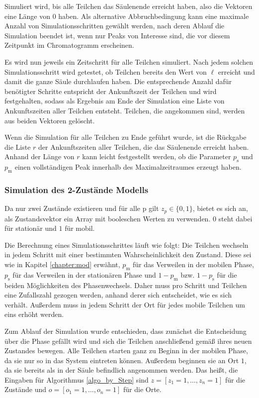 Simuliert wird, bis alle Teilchen das Säulenende erreicht haben, also die Vektoren eine Länge von $0$ haben. 
Als alternative Abbruchbedingung kann eine maximale Anzahl von Simulationsschritten gewählt werden, nach deren Ablauf die Simulation beendet ist, wenn nur Peaks von Interesse sind, die vor diesem Zeitpunkt im Chromatogramm erscheinen.

Es wird nun jeweils ein Zeitschritt für alle Teilchen simuliert. Nach jedem solchen Simulationsschritt wird getestet, ob Teilchen bereits den Wert von $\ell$ erreicht und damit die ganze Säule durchlaufen haben. Die entsprechende Anzahl dafür benötigter Schritte entspricht der Ankunftszeit der Teilchen und wird festgehalten, sodass als Ergebnis am Ende der Simulation eine Liste von Ankunftszeiten aller Teilchen entsteht. Teilchen, die angekommen sind, werden aus beiden Vektoren gelöscht.

Wenn die Simulation für alle Teilchen zu Ende geführt wurde, ist die Rückgabe die Liste $r$ der Ankunftszeiten aller Teilchen, die das Säulenende erreicht haben. Anhand der Länge von $r$ kann leicht festgestellt werden, ob die Parameter $p_{\text{s}}$ und $p_{\text{m}}$ einen vollständigen Peak innerhalb des Maximalzeitraumes erzeugt haben. 


\subsubsection{Simulation des 2-Zustände Modells}

Da nur zwei Zustände existieren und für alle p gilt $z_p \in \{0,1\}$, bietet es sich an, als Zustandsvektor ein Array mit booleschen Werten zu verwenden. $0$ steht dabei für stationär und $1$ für mobil.

Die Berechnung eines Simulationsschrittes läuft wie folgt: Die Teilchen wechseln in jedem Schritt mit einer bestimmten Wahrscheinlichkeit den Zustand. Diese sei wie in Kapitel \ref{chapter:mod} erwähnt, $p_{\text{m}}$ für das Verweilen in der mobilen Phase, $p_{\text{s}}$ für das Verweilen in der stationären Phase und $1-p_{\text{m}}$ bzw. $1-p_{\text{s}}$ für die beiden Möglichkeiten des Phasenwechsels. Daher muss pro Schritt und Teilchen eine Zufallszahl gezogen werden, anhand derer sich entscheidet, wie es sich verhält. Außerdem muss in jedem Schritt der Ort für jedes mobile Teilchen um eins erhöht werden.

Zum Ablauf der Simulation wurde entschieden, dass zunächst die Entscheidung über die Phase gefällt wird und sich die Teilchen anschließend gemäß ihres neuen Zustandes bewegen. Alle Teilchen starten ganz zu Beginn in der mobilen Phase, da sie nur so in das System eintreten können. Außerdem beginnen sie an Ort $1$, da sie bereits als in der Säule befindlich angenommen werden. Das heißt, die Eingaben für Algorithmus \ref{algo_by_Step} sind $z= [z_1 = 1, \ldots, z_n=1]$ für die Zustände und $o= [o_1 = 1, \ldots, o_n=1]$ für die Orte.

